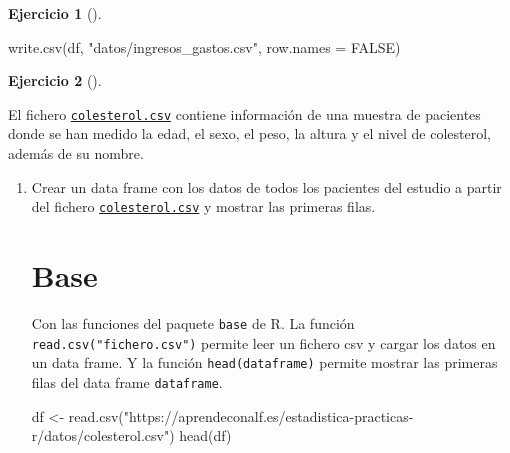 \documentclass[
  a4paper,
]{scrreport}
\newenvironment{Shaded}{\begin{snugshade}}{\end{snugshade}}
\newcommand{\AttributeTok}[1]{\textcolor[rgb]{0.40,0.45,0.13}{#1}}
\newcommand{\ConstantTok}[1]{\textcolor[rgb]{0.56,0.35,0.01}{#1}}
\newcommand{\FunctionTok}[1]{\textcolor[rgb]{0.28,0.35,0.67}{#1}}
\newcommand{\NormalTok}[1]{\textcolor[rgb]{0.00,0.23,0.31}{#1}}
\newcommand{\OtherTok}[1]{\textcolor[rgb]{0.00,0.23,0.31}{#1}}
\newcommand{\StringTok}[1]{\textcolor[rgb]{0.13,0.47,0.30}{#1}}
\theoremstyle{definition}
\newtheorem{exercise}{Ejercicio}[chapter]
\theoremstyle{remark}
\begin{document}
\begin{exercise}[]
\begin{enumerate}
\begin{tcolorbox}
\begin{Shaded}
\begin{Highlighting}[]
\FunctionTok{write.csv}\NormalTok{(df, }\StringTok{"datos/ingresos\_gastos.csv"}\NormalTok{, }\AttributeTok{row.names =} \ConstantTok{FALSE}\NormalTok{)}
\end{Highlighting}
\end{Shaded}

  \end{tcolorbox}
\end{enumerate}

\end{exercise}

\begin{exercise}[]\protect\hypertarget{exr-dataframes-2}{}\label{exr-dataframes-2}

El fichero \href{datos/colesterol.csv}{\texttt{colesterol.csv}} contiene
información de una muestra de pacientes donde se han medido la edad, el
sexo, el peso, la altura y el nivel de colesterol, además de su nombre.

\begin{enumerate}
\def\labelenumi{\alph{enumi}.}
\item
  Crear un data frame con los datos de todos los pacientes del estudio a
  partir del fichero
  \href{datos/colesterol.csv}{\texttt{colesterol.csv}} y mostrar las
  primeras filas.

  \begin{tcolorbox}[enhanced jigsaw, colframe=quarto-callout-tip-color-frame, toprule=.15mm, bottomtitle=1mm, breakable, opacitybacktitle=0.6, toptitle=1mm, colback=white, bottomrule=.15mm, title=\textcolor{quarto-callout-tip-color}{\faLightbulb}\hspace{0.5em}{Solución}, arc=.35mm, left=2mm, titlerule=0mm, rightrule=.15mm, coltitle=black, leftrule=.75mm, opacityback=0, colbacktitle=quarto-callout-tip-color!10!white]

  \section{Base}

  Con las funciones del paquete \texttt{base} de R. La función
  \texttt{read.csv("fichero.csv")} permite leer un fichero csv y cargar
  los datos en un data frame. Y la función \texttt{head(dataframe)}
  permite mostrar las primeras filas del data frame \texttt{dataframe}.

\begin{Shaded}
\begin{Highlighting}[]
\NormalTok{df }\OtherTok{\textless{}{-}} \FunctionTok{read.csv}\NormalTok{(}\StringTok{"https://aprendeconalf.es/estadistica{-}practicas{-}r/datos/colesterol.csv"}\NormalTok{)}
\FunctionTok{head}\NormalTok{(df)}
\end{Highlighting}
\end{Shaded}


\end{tcolorbox}
\end{enumerate}
\end{exercise}
\end{document}
